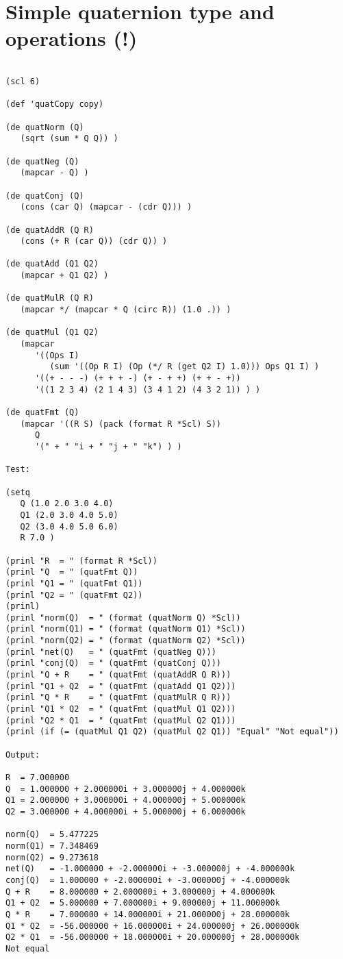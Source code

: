 \section*{Simple quaternion type and operations (!)}

\begin{verbatim}

(scl 6)

(def 'quatCopy copy)

(de quatNorm (Q)
   (sqrt (sum * Q Q)) )

(de quatNeg (Q)
   (mapcar - Q) )

(de quatConj (Q)
   (cons (car Q) (mapcar - (cdr Q))) )

(de quatAddR (Q R)
   (cons (+ R (car Q)) (cdr Q)) )

(de quatAdd (Q1 Q2)
   (mapcar + Q1 Q2) )

(de quatMulR (Q R)
   (mapcar */ (mapcar * Q (circ R)) (1.0 .)) )

(de quatMul (Q1 Q2)
   (mapcar
      '((Ops I)
         (sum '((Op R I) (Op (*/ R (get Q2 I) 1.0))) Ops Q1 I) )
      '((+ - - -) (+ + + -) (+ - + +) (+ + - +))
      '((1 2 3 4) (2 1 4 3) (3 4 1 2) (4 3 2 1)) ) )

(de quatFmt (Q)
   (mapcar '((R S) (pack (format R *Scl) S))
      Q
      '(" + " "i + " "j + " "k") ) )

Test:

(setq
   Q (1.0 2.0 3.0 4.0)
   Q1 (2.0 3.0 4.0 5.0)
   Q2 (3.0 4.0 5.0 6.0)
   R 7.0 )

(prinl "R  = " (format R *Scl))
(prinl "Q  = " (quatFmt Q))
(prinl "Q1 = " (quatFmt Q1))
(prinl "Q2 = " (quatFmt Q2))
(prinl)
(prinl "norm(Q)  = " (format (quatNorm Q) *Scl))
(prinl "norm(Q1) = " (format (quatNorm Q1) *Scl))
(prinl "norm(Q2) = " (format (quatNorm Q2) *Scl))
(prinl "net(Q)   = " (quatFmt (quatNeg Q)))
(prinl "conj(Q)  = " (quatFmt (quatConj Q)))
(prinl "Q + R    = " (quatFmt (quatAddR Q R)))
(prinl "Q1 + Q2  = " (quatFmt (quatAdd Q1 Q2)))
(prinl "Q * R    = " (quatFmt (quatMulR Q R)))
(prinl "Q1 * Q2  = " (quatFmt (quatMul Q1 Q2)))
(prinl "Q2 * Q1  = " (quatFmt (quatMul Q2 Q1)))
(prinl (if (= (quatMul Q1 Q2) (quatMul Q2 Q1)) "Equal" "Not equal"))

Output:

R  = 7.000000
Q  = 1.000000 + 2.000000i + 3.000000j + 4.000000k
Q1 = 2.000000 + 3.000000i + 4.000000j + 5.000000k
Q2 = 3.000000 + 4.000000i + 5.000000j + 6.000000k

norm(Q)  = 5.477225
norm(Q1) = 7.348469
norm(Q2) = 9.273618
net(Q)   = -1.000000 + -2.000000i + -3.000000j + -4.000000k
conj(Q)  = 1.000000 + -2.000000i + -3.000000j + -4.000000k
Q + R    = 8.000000 + 2.000000i + 3.000000j + 4.000000k
Q1 + Q2  = 5.000000 + 7.000000i + 9.000000j + 11.000000k
Q * R    = 7.000000 + 14.000000i + 21.000000j + 28.000000k
Q1 * Q2  = -56.000000 + 16.000000i + 24.000000j + 26.000000k
Q2 * Q1  = -56.000000 + 18.000000i + 20.000000j + 28.000000k
Not equal

\end{verbatim}

